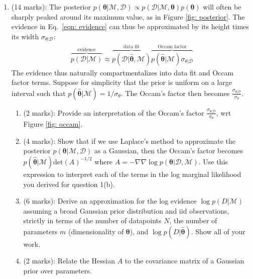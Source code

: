 \documentclass[11pt]{article}
\newcommand{\mbf}[1]{{\boldsymbol{\mathbf{#1}}}}
\renewcommand{\bm}{\mbf}
\begin{document}
\begin{enumerate}
\item (14 marks): The posterior $p(\bm{\theta} | \mathcal{M}, \mathcal{D}) \propto p(\mathcal{D} | \mathcal{M}, \bm{\theta}) p(\bm{\theta})$ will often be sharply peaked around its maximum value, as in Figure \ref{fig: posterior}.  The evidence in Eq.~\eqref{eqn: evidence} can thus be approximated by its height times its width $\sigma_{\theta | \mathcal{D}}$:
\begin{align}
\overbrace{p(\mathcal{D} | \mathcal{M})}^{\text{evidence}} \approx \overbrace{p(\mathcal{D} | \hat{\bm{\theta}}, \mathcal{M})}^{\text{data fit}} \overbrace{p(\hat{\bm{\theta}} | \mathcal{M}) \sigma_{\theta | \mathcal{D}}}^{\text{Occam factor}}
\end{align}
The evidence thus naturally compartmentalizes into data fit and Occam factor terms.  Suppose for simplicity that the prior is uniform on a large interval such that $p(\hat{\bm{\theta}} | \mathcal{M}) = 1/\sigma_{\theta}$.  The Occam's 
factor then becomes $\frac{\sigma_{\theta|\mathcal{D}}}{\sigma_{\theta}}$. 
\begin{enumerate}[label=(\alph*)]
\item (2 marks): Provide an interpretation of the Occam's factor $\frac{\sigma_{\theta|\mathcal{D}}}{\sigma_{\theta}}$, wrt Figure \ref{fig: occam}.
\item (4 marks): Show that if we use Laplace's method to approximate the posterior $p(\bm{\theta} | \mathcal{M}, \mathcal{D})$ 
as a Gaussian, then the Occam's factor becomes 
$p(\hat{\bm{\theta}} | \mathcal{M}) \text{det}(A)^{-1/2}$ where $A = -\nabla \nabla \log p(\bm{\theta} | \mathcal{D},\mathcal{M})$.  Use this expression to interpret each of the terms in the log marginal likelihood you derived for question 1(b).
\item (6 marks): Derive an approximation for the log evidence $\log p(D | \mathcal{M})$ assuming a broad Gaussian prior distribution and iid observations, strictly in terms of the number of datapoints $N$, the number of parameters $m$ (dimensionality of $\bm{\theta}$), and 
$\log p(D | \hat{\bm{\theta}})$.  Show all of your work.
\item (2 marks): Relate the Hessian $A$ to the covariance matrix of a Gaussian prior over parameters.
\end{enumerate}


\end{enumerate}
\end{document}
